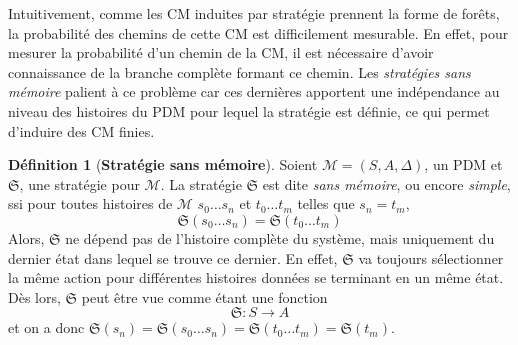 \documentclass[12pt,a4paper]{report}
\theoremstyle{definition}%
\newtheorem{definition}{Définition}[chapter]
\theoremstyle{remark}
\begin{document}
Intuitivement, comme les CM induites par stratégie prennent la forme de forêts,
la probabilité des chemins de cette CM est difficilement mesurable. En effet,
pour mesurer la probabilité d'un chemin de la CM, il est nécessaire d'avoir connaissance
de la branche complète formant ce chemin.
Les \textit{stratégies sans mémoire} palient à ce problème car ces dernières
apportent une indépendance au niveau des histoires du PDM pour lequel la
stratégie est définie, ce qui permet d'induire des CM finies.

\begin{definition}[\textbf{Stratégie sans mémoire}]
	Soient $\mathcal{M} = (S, A, \Delta)$, un PDM et $\mathfrak{S}$, une stratégie
	pour $\mathcal{M}$. La stratégie $\mathfrak{S}$ est dite \textit{sans mémoire},
	ou encore \textit{simple}, ssi pour toutes histoires de $\mathcal{M}$ $s_0 \dots s_n$ et
	$t_0 \dots t_m$ telles que $s_n = t_m$,
	\[
		\mathfrak{S}(s_0 \dots s_n) = \mathfrak{S}(t_0 \dots t_m)
	\]
	Alors, $\mathfrak{S}$ ne dépend pas de l'histoire complète du système, mais
	uniquement du dernier état dans lequel se trouve ce dernier. En effet,
	$\mathfrak{S}$ va toujours sélectionner la même action pour différentes histoires données
	se terminant en un même état.
	Dès lors, $\mathfrak{S}$ peut être vue comme étant une fonction
	\[
		\mathfrak{S}: S \rightarrow A
	\]
	et on a donc
	$\mathfrak{S}(s_n) = \mathfrak{S}(s_0 \dots s_n) = \mathfrak{S}(t_0 \dots t_m) = \mathfrak{S}(t_m)$.
\end{definition}
\end{document}
